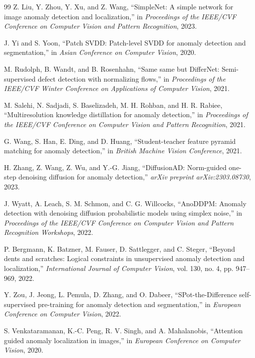 \documentclass[10pt,conference]{IEEEtran}
\begin{document}
\begin{thebibliography}{99}
Z. Liu, Y. Zhou, Y. Xu, and Z. Wang, ``SimpleNet: A simple network for
image anomaly detection and localization,'' in \emph{Proceedings of the
IEEE/CVF Conference on Computer Vision and Pattern Recognition}, 2023.

J. Yi and S. Yoon, ``Patch SVDD: Patch-level SVDD for anomaly detection
and segmentation,'' in \emph{Asian Conference on Computer Vision}, 2020.

M. Rudolph, B. Wandt, and B. Rosenhahn, ``Same same but DifferNet:
Semi-supervised defect detection with normalizing flows,'' in
\emph{Proceedings of the IEEE/CVF Winter Conference on Applications of
Computer Vision}, 2021.

M. Salehi, N. Sadjadi, S. Baselizadeh, M. H. Rohban, and H. R. Rabiee,
``Multiresolution knowledge distillation for anomaly detection,'' in
\emph{Proceedings of the IEEE/CVF Conference on Computer Vision and Pattern
Recognition}, 2021.

G. Wang, S. Han, E. Ding, and D. Huang, ``Student-teacher feature pyramid
matching for anomaly detection,'' in \emph{British Machine Vision
Conference}, 2021.

H. Zhang, Z. Wang, Z. Wu, and Y.-G. Jiang, ``DiffusionAD: Norm-guided
one-step denoising diffusion for anomaly detection,'' \emph{arXiv preprint
arXiv:2303.08730}, 2023.

J. Wyatt, A. Leach, S. M. Schmon, and C. G. Willcocks, ``AnoDDPM: Anomaly
detection with denoising diffusion probabilistic models using simplex
noise,'' in \emph{Proceedings of the IEEE/CVF Conference on Computer Vision
and Pattern Recognition Workshops}, 2022.

P. Bergmann, K. Batzner, M. Fauser, D. Sattlegger, and C. Steger, ``Beyond
dents and scratches: Logical constraints in unsupervised anomaly detection
and localization,'' \emph{International Journal of Computer Vision},
vol. 130, no. 4, pp. 947--969, 2022.

Y. Zou, J. Jeong, L. Pemula, D. Zhang, and O. Dabeer, ``SPot-the-Difference
self-supervised pre-training for anomaly detection and segmentation,'' in
\emph{European Conference on Computer Vision}, 2022.

S. Venkataramanan, K.-C. Peng, R. V. Singh, and A. Mahalanobis,
``Attention guided anomaly localization in images,'' in \emph{European
Conference on Computer Vision}, 2020.


\end{thebibliography}
\end{document}
